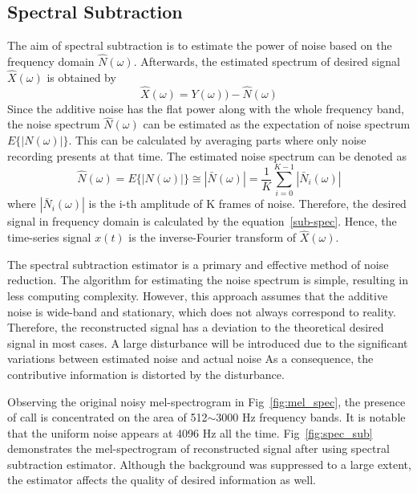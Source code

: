 \subsection{Spectral Subtraction}
The aim of spectral subtraction is to estimate the power of noise based on the frequency domain $\hat N(\omega)$. Afterwards, the estimated spectrum of desired signal $\hat X(\omega)$ is obtained by
\begin{equation}
\hat X(\omega)=Y(\omega))- \hat N(\omega)
\label{sub-spec}
\end{equation}
Since the additive noise has the flat power along with the whole frequency band, the noise spectrum $\hat N(\omega)$ can be estimated as the expectation of noise spectrum $E\{|N(\omega)| \}$. This can be calculated by averaging parts where only noise recording presents at that time. The estimated noise spectrum can be denoted as 
\begin{equation}
\hat N(\omega)=E\{|N(\omega)| \}\cong |\bar N(\omega)|= \frac{1}{K}\sum_{i=0}^{K-1} |\bar N_i(\omega)|
\end{equation}
where $|\bar N_i(\omega)|$ is the i-th amplitude of K frames of noise. Therefore, the desired signal in frequency domain is calculated by the equation~\ref{sub-spec}. Hence, the time-series signal $x(t)$ is the inverse-Fourier transform of $\hat X(\omega)$.\par
The spectral subtraction estimator is a primary and effective method of noise reduction. The algorithm for estimating the noise spectrum is simple, resulting in less computing complexity. However, this approach assumes that the additive noise is wide-band and stationary, which does not always correspond to reality. Therefore, the reconstructed signal has a deviation to the theoretical desired signal in most cases. A large disturbance will be introduced due to the significant variations between estimated noise and actual noise As a consequence, the contributive information is distorted by the disturbance.
\par
Observing the original noisy mel-spectrogram in Fig~\ref{fig:mel_spec}, the presence of call is concentrated on the area of 512$\sim$3000 Hz frequency bands. It is notable that the uniform noise appears at 4096 Hz all the time. Fig~\ref{fig:spec_sub} demonstrates the  mel-spectrogram of reconstructed signal after using spectral subtraction estimator. Although the background was suppressed to a large extent, the estimator affects the quality of desired information as well. 

